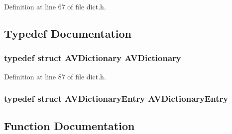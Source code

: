 Definition at line 67 of file dict.\+h.



\subsection{Typedef Documentation}
\subsubsection[{\texorpdfstring{A\+V\+Dictionary}{AVDictionary}}]{\setlength{\rightskip}{0pt plus 5cm}typedef struct {\bf A\+V\+Dictionary} {\bf A\+V\+Dictionary}}\hypertarget{group__lavu__dict_ga1d7cc0833bee918994a600556410315f}{}\label{group__lavu__dict_ga1d7cc0833bee918994a600556410315f}


Definition at line 87 of file dict.\+h.

\subsubsection[{\texorpdfstring{A\+V\+Dictionary\+Entry}{AVDictionaryEntry}}]{\setlength{\rightskip}{0pt plus 5cm}typedef struct {\bf A\+V\+Dictionary\+Entry}  {\bf A\+V\+Dictionary\+Entry}}\hypertarget{group__lavu__dict_gabd3d99365f54396328c265f9e5753f5c}{}\label{group__lavu__dict_gabd3d99365f54396328c265f9e5753f5c}


\subsection{Function Documentation}

